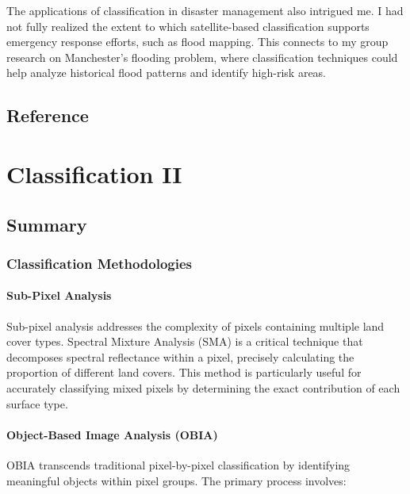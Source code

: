 \documentclass[
  letterpaper,
]{scrbook}
\begin{document}
The applications of classification in disaster management also intrigued
me. I had not fully realized the extent to which satellite-based
classification supports emergency response efforts, such as flood
mapping. This connects to my group research on Manchester's flooding
problem, where classification techniques could help analyze historical
flood patterns and identify high-risk areas.

\section{Reference}\label{reference-4}


\chapter{Classification II}\label{classification-ii}

\section{Summary}\label{summary-5}

\subsection{Classification
Methodologies}\label{classification-methodologies}

\subsubsection{Sub-Pixel Analysis}\label{sub-pixel-analysis}

Sub-pixel analysis addresses the complexity of pixels containing
multiple land cover types. Spectral Mixture Analysis (SMA) is a critical
technique that decomposes spectral reflectance within a pixel, precisely
calculating the proportion of different land covers. This method is
particularly useful for accurately classifying mixed pixels by
determining the exact contribution of each surface type.

\subsubsection{Object-Based Image Analysis
(OBIA)}\label{object-based-image-analysis-obia}

OBIA transcends traditional pixel-by-pixel classification by identifying
meaningful objects within pixel groups. The primary process involves:
\end{document}
